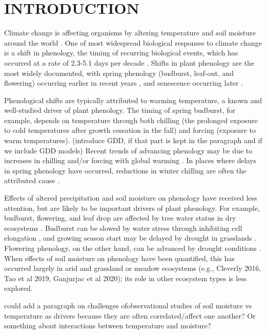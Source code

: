 \documentclass{article}
\begin{document}
\section* {INTRODUCTION}
\par Climate change is affecting organisms by altering temperature and soil moisture around the world \citep{parmesan2006,chen2011}. One of most widespread biological responses to climate change is a shift in phenology, the timing of recurring biological events, which has occurred at a rate of 2.3-5.1 days per decade \citep{parmesan2006,poloczanska2013,root2003}. Shifts in plant phenology are the most widely documented, with spring phenology (budburst, leaf-out, and flowering) occurring earlier in recent years \citep{wolkovich2012}, and senescence occurring later \citep{taylor2008,delpierre2009}. 
\par Phenological shifts are typically attributed to warming temperature, a known and well-studied driver of plant phenology. The timing of spring budburst, for example, depends on temperature through both chilling (the prolonged exposure to cold temperatures after growth cessation in the fall) and forcing (exposure to warm temperatures). (introduce GDD, if that part is kept in the paragraph and if we include GDD models) Recent trends of advancing phenology may be due to increases in chilling and/or forcing with global warming \citep{fujisawa2010, ibanez2010,cook2012b}. In places where delays in spring phenology have occurred, reductions in winter chilling are often the attributed cause \citep{yu2010}. 
\par Effects of altered precipitation and soil moisture on phenology have received less attention, but are likely to be important drivers of plant phenology. For example, budburst, flowering, and leaf drop are affected by tree water status in dry ecosystems \citep[e.g., ][]{essiamah1986,reich1984, van1993}. Budburst can be slowed by water stress through inhibiting cell elongation \citep{essiamah1986}, and growing season start may be delayed by drought in grasslands \cite{cui2017}. Flowering phenology, on the other hand, can be advanced by drought conditions \citep{hamann2018}. When effects of soil moisture on phenology have been quantified, this has occurred largely in arid and grassland or meadow ecosystems (e.g., Cleverly 2016, Tao et al 2019, Ganjurjac et al 2020); its role in other ecosystem types is less explored.
\par could add a paragraph on challenges ofobservational studies of soil moisture vs temperature as drivers because they are often correlated/affect one another? Or something about interactions between temperature and moisture? 
\end{document}
